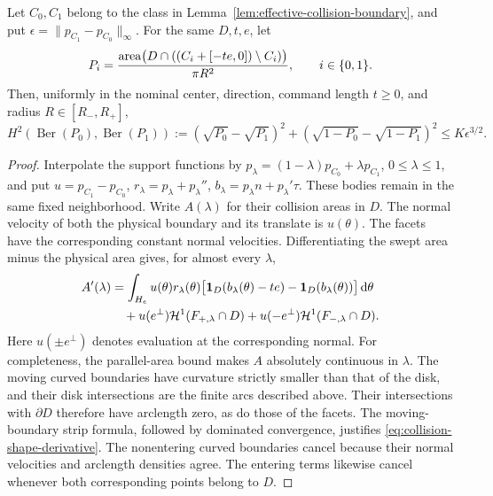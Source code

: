 \begin{lemma}
\label{lem:all-short-hellinger}
Let $C_0,C_1$ belong to the class in
Lemma~\ref{lem:effective-collision-boundary}, and put
$\epsilon=\|p_{C_1}-p_{C_0}\|_\infty$. For the same $D,t,e$, let
\[
 P_i=\frac{\operatorname{area}\bigl(D\cap((C_i+[-te,0])\setminus C_i)\bigr)}
                 {\pi R^2},\qquad i\in\{0,1\}.
\]
Then, uniformly in the nominal center, direction, command length
$t\ge0$, and radius $R\in[R_-,R_+]$,
\begin{equation}\label{eq:all-short-hellinger}
 H^2(\operatorname{Ber}(P_0),\operatorname{Ber}(P_1))
 :=(\sqrt{P_0}-\sqrt{P_1})^2
    +(\sqrt{1-P_0}-\sqrt{1-P_1})^2
                         \le K\epsilon^{3/2}.
\end{equation}
\end{lemma}
\begin{proof}
Interpolate the support functions by
$p_\lambda=(1-\lambda)p_{C_0}+\lambda p_{C_1}$, $0\le\lambda\le1$,
and put $u=p_{C_1}-p_{C_0}$, $r_\lambda=p_\lambda+p_\lambda''$,
$b_\lambda=p_\lambda n+p_\lambda'\tau$. These bodies remain in the
same fixed neighborhood. Write $A(\lambda)$ for their collision areas
in $D$. The normal velocity of both the physical boundary and its
translate is $u(\theta)$. The facets have the corresponding constant
normal velocities. Differentiating the swept area minus the physical
area gives, for almost every $\lambda$,
\begin{align}
 A'(\lambda)
 &=\int_{H_e}u(\theta)r_\lambda(\theta)
     \bigl[\mathbf 1_D(b_\lambda(\theta)-te)
                  -\mathbf 1_D(b_\lambda(\theta))\bigr]\,\mathrm d\theta
          \label{eq:collision-shape-derivative}\\
 &\quad+u(e^\perp)\mathcal H^1(F_{+,\lambda}\cap D)
       +u(-e^\perp)\mathcal H^1(F_{-,\lambda}\cap D).\nonumber
\end{align}
Here $u(\pm e^\perp)$ denotes evaluation at the corresponding normal.
For completeness, the parallel-area bound makes $A$ absolutely
continuous in $\lambda$. The moving curved boundaries have curvature
strictly smaller than that of the disk, and their disk intersections
are the finite arcs described above. Their intersections with
$\partial D$ therefore have arclength zero, as do those of the facets.
The moving-boundary strip formula, followed by dominated convergence,
justifies \eqref{eq:collision-shape-derivative}. The nonentering
curved boundaries cancel because their normal velocities and arclength
densities agree. The entering terms likewise cancel whenever both
corresponding points belong to $D$.


\end{proof}
